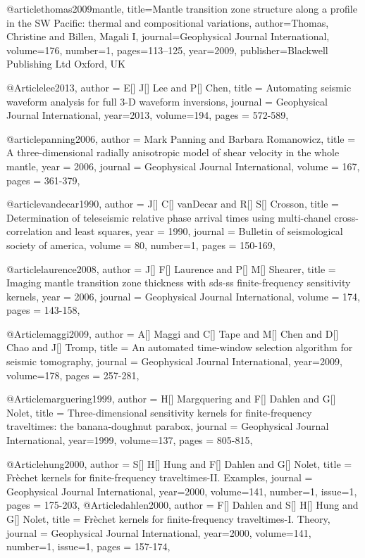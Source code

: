 @article{thomas2009mantle,
  title={Mantle transition zone structure along a profile in the SW Pacific: thermal and compositional variations},
  author={Thomas, Christine and Billen, Magali I},
  journal={Geophysical Journal International},
  volume={176},
  number={1},
  pages={113--125},
  year={2009},
  publisher={Blackwell Publishing Ltd Oxford, UK}
}



@Article{lee2013,
  author =	 {E[] J[] Lee and P[] Chen},
  title =	 {Automating seismic waveform analysis for full 3-{D} waveform inversions},
  journal =	 {Geophysical Journal International},
  year=2013,
  volume=194,
  pages =	 {572-589},
}

@article{panning2006,
author = {Mark Panning and Barbara Romanowicz},
title = {A three-dimensional radially anisotropic model of shear velocity
in the whole mantle},
year = {2006},
journal = {Geophysical Journal International},
volume = {167},
pages = {361-379},
}

@article{vandecar1990,
author = {J[] C[] vanDecar and R[] S[] Crosson},
title = {Determination of teleseismic relative phase arrival times using multi-chanel cross-correlation and least squares},
year = {1990},
journal = {Bulletin of seismological society of america},
volume = {80},
number=1,
pages = {150-169},
}

@article{laurence2008,
author = {J[] F[] Laurence and P[] M[] Shearer},
title = {Imaging mantle transition zone thickness with sds-ss finite-frequency sensitivity kernels},
year = {2006},
journal = {Geophysical Journal International},
volume = {174},
pages = {143-158},
}



@Article{maggi2009,
  author =	 {A[] Maggi and C[] Tape and M[] Chen and D[] Chao and J[] Tromp},
  title =	 {An automated time-window selection algorithm for seismic tomography},
  journal =	 {Geophysical Journal International},
  year=2009,
  volume=178,
  pages =	 {257-281},
}

@Article{marguering1999,
  author =	 {H[] Margquering and F[] Dahlen and G[] Nolet},
  title =	 {Three-dimensional sensitivity kernels for finite-frequency traveltimes: the banana-doughnut parabox},
  journal =	 {Geophysical Journal International},
  year=1999,
  volume=137,
  pages =	 {805-815},
}

@Article{hung2000,
  author =	 {S[] H[] Hung and F[] Dahlen and G[] Nolet},
  title =	 {Fr\`{e}chet kernels for finite-frequency traveltimes-II. Examples},
  journal =	 {Geophysical Journal International},
  year=2000,
  volume=141,
  number=1,
  issue=1,
  pages =	 {175-203},
}
@Article{dahlen2000,
  author =	 { F[] Dahlen and S[] H[] Hung and G[] Nolet},
  title =	 {Fr\`{e}chet kernels for finite-frequency traveltimes-I. Theory},
  journal =	 {Geophysical Journal International},
  year=2000,
  volume=141,
  number=1,
  issue=1,
  pages =	 {157-174},
}

